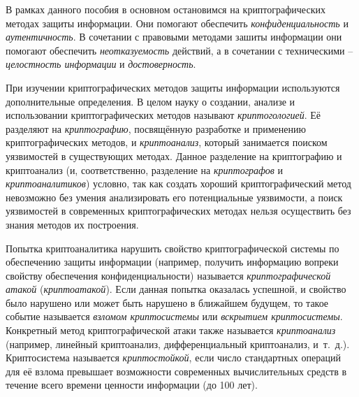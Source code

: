 В рамках данного пособия в основном остановимся на криптографических методах защиты информации. Они помогают обеспечить \emph{конфиденциальность} и \emph{аутентичность}. В сочетании с правовыми методами зашиты информации они помогают обеспечить \emph{неотказуемость} действий, а в сочетании с техническими -- \emph{целостность информации} и \emph{достоверность}.

При изучении криптографических методов защиты информации используются дополнительные определения. В целом науку о создании, анализе и использовании криптографических методов называют \emph{криптогологией}. Её разделяют на \emph{криптографию}, посвящённую разработке и применению криптографических методов, и \emph{криптоанализ}, который занимается поиском уязвимостей в существующих методах. Данное разделение на криптографию и криптоанализ (и, соответственно, разделение на \emph{криптографов} и \emph{криптоаналитиков}) условно, так как создать хороший криптографический метод невозможно без умения анализировать его потенциальные уязвимости, а поиск уязвимостей в современных криптографических методах нельзя осуществить без знания методов их построения.

Попытка криптоаналитика нарушить свойство криптографической системы по обеспечению защиты информации (например, получить информацию вопреки свойству обеспечения конфиденциальности) называется \emph{криптографической атакой} (\emph{криптоатакой}). Если данная попытка оказалась успешной, и свойство было нарушено или может быть нарушено в ближайшем будущем, то такое событие называется \emph{взломом криптосистемы} или \emph{вскрытием криптосистемы}. Конкретный метод криптографической атаки также называется \emph{криптоанализ} (например, линейный криптоанализ, дифференциальный криптоанализ, и~т.~д.). Криптосистема называется \emph{криптостойкой}, если число стандартных операций для её взлома превышает возможности современных вычислительных средств в течение всего времени ценности информации (до 100 лет).

